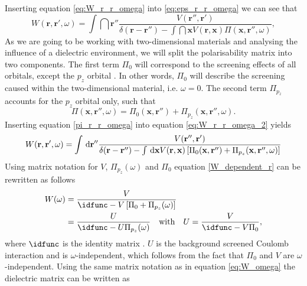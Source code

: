 Inserting equation \ref{eq:W_r_r_omega} into \ref{eq:eps_r_r_omega} we can see that \cite{Westerhout2021}
\begin{equation}\label{eq:W_r_r_omega_2}
    W(\mathbf{r},\mathbf{r}',\omega)=\int\dint\mathbf{r}''\frac{V(\mathbf{r}'',\mathbf{r}')}{\delta(\mathbf{r}-\mathbf{r''})-\int\dint\mathbf{x}V(\mathbf{r},\mathbf{x})\Pi(\mathbf{x},\mathbf{r}'',\omega)},
\end{equation}
As we are going to be working with two-dimensional materials and analysing the influence of a dielectric environment, we will split the polarisability matrix into two components. The first term $\Pi_0$ will correspond to the screening effects of all orbitals, except the $p_z$ orbital \cite{Westerhout2021}. In other words, $\Pi_0$ will describe the screening caused within the two-dimensional material, i.e. $\omega=0$. The second term $\Pi_{p_z}$ accounts for the $p_z$ orbital only, such that \cite{Westerhout2021}
\begin{equation}\label{pi_r_r_omega}
    \Pi(\mathbf{x},\mathbf{r}'',\omega) = \Pi_0(\mathbf{x},\mathbf{r}'') + \Pi_{p_z}(\mathbf{x},\mathbf{r}'',\omega).
\end{equation}
Inserting equation \ref{pi_r_r_omega} into equation \ref{eq:W_r_r_omega_2} yields \cite{Westerhout2021}
\begin{equation}\label{W_dependent_r}
    W(\mathbf{r},\mathbf{r}',\omega)=\int\,\mathrm{d}\mathbf{r}''\frac{V(\mathbf{r}'',\mathbf{r}')}{\delta(\mathbf{r}-\mathbf{r''})-\int\,\mathrm{d}\mathbf{x}V(\mathbf{r},\mathbf{x})\left[\Pi_0(\mathbf{x},\mathbf{r}'') + \Pi_{p_z}(\mathbf{x},\mathbf{r}'',\omega)\right]}
\end{equation}
Using matrix notation for $V$, $\Pi_{p_z}(\omega)$ and $\Pi_0$ equation \ref{W_dependent_r} can be rewritten as follows
\begin{equation}\label{eq:W_omega}
\begin{split}
    W(\omega)&=\frac{V}{\idfunc - V\abrackets{\Pi_0+ \Pi_{p_z}(\omega)}}\\
    &=\frac{U}{\idfunc-U \Pi_{p_z}(\omega)}\with U=\frac{V}{\idfunc-V \Pi_0},
\end{split}
\end{equation}
where $\idfunc$ is the identity matrix \cite{Westerhout2021}. $U$ is the background screened Coulomb interaction and is $\omega$-independent, which follows from the fact that $\Pi_0$ and $V$ are $\omega$-independent. Using the same matrix notation as in equation \ref{eq:W_omega} the dielectric matrix can be written as \cite{Westerhout2021,Groenewald2016}
